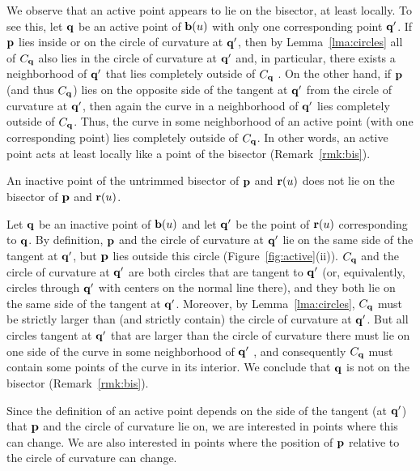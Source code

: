 \begin{rmk}
\label{r:active}
{\rm
We observe that an active point appears to lie on the bisector, at least
locally. To see this, let ${\bf q}$ be an active point of ${\bf b}(u)$
with only one corresponding point ${\bf q}'$. If ${\bf p}$ lies inside or
on the circle of curvature at ${\bf q}'$, then by Lemma~\ref{lma:circles}
all of $C_{\bf q}$ also lies in the circle of curvature at ${\bf q}'$ and,
in particular, there exists a neighborhood of ${\bf q}'$
that lies completely outside of $C_{\bf q}$ \cite[p.~176]{H52}.
On the other hand, if ${\bf p}$ (and thus $C_{\bf q}$) lies on the opposite side
of the tangent at ${\bf q}'$ from the circle of curvature at ${\bf q}'$,
then again the curve in a neighborhood of ${\bf q}'$ lies completely outside of
$C_{\bf q}$.
Thus, the curve in some neighborhood of an active point (with one corresponding
point) lies completely outside of $C_{\bf q}$.
In other words, an active point acts at least locally
like a point of the bisector (Remark~\ref{rmk:bis}).
}
\end{rmk}

\begin{propn}
An inactive point of the untrimmed bisector of ${\bf p}$ and ${\bf r}(u)$
does not lie on the bisector of ${\bf p}$ and ${\bf r}(u)$.
\end{propn}
\prf
Let ${\bf q}$ be an inactive point of ${\bf b}(u)$ and let ${\bf q}'$
be the point of ${\bf r}(u)$ corresponding to ${\bf q}$. By definition,
${\bf p}$ and the circle of curvature at ${\bf q}'$ lie on the same side
of the tangent at ${\bf q}'$, but ${\bf p}$ lies outside this circle
(Figure~\ref{fig:active}(ii)). $C_{\bf q}$ and the circle of curvature
at ${\bf q}'$ are both circles that are tangent to ${\bf q}'$ (or,
equivalently, circles through ${\bf q}'$ with centers on the normal
line there), and they both lie on the same side of the tangent at
${\bf q}'$. Moreover, by Lemma~\ref{lma:circles}, $C_{\bf q}$ must
be strictly larger than (and strictly contain) the circle of curvature
at ${\bf q}'$. But all circles tangent at ${\bf q}'$ that are larger
than the circle of curvature there must lie on one side of the curve
in some neighborhood of ${\bf q}'$ \cite[p.~176]{H52}, and consequently
$C_{\bf q}$ must contain some points of the curve in its interior. We
conclude that ${\bf q}$ is not on the bisector (Remark~\ref{rmk:bis}).
\QED

Since the definition of an active point depends on the side of the
tangent (at ${\bf q}'$) that ${\bf p}$ and the circle of curvature lie
on, we are interested in points where this can change.
We are also interested in points where the position of ${\bf p}$
relative to the circle of curvature can change.


